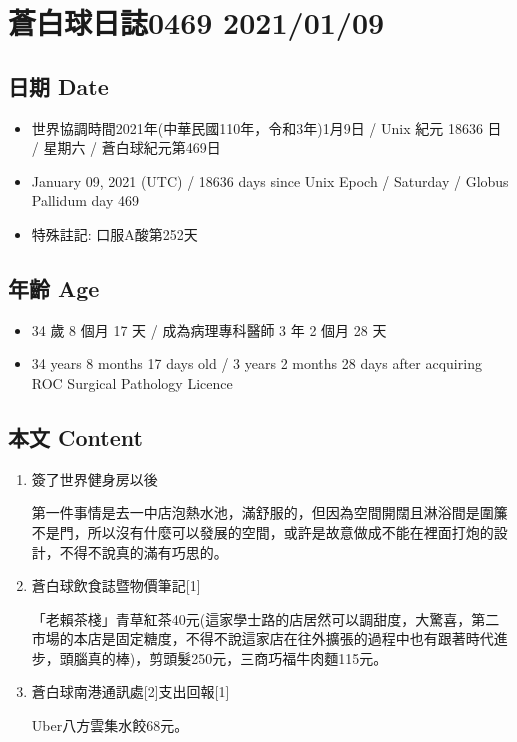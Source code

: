 \documentclass[a5paper, 11pt
]{book}
\providecommand{\tightlist}{%
  \setlength{\itemsep}{0pt}\setlength{\parskip}{0pt}}
\begin{document}
\hypertarget{ux84bcux767dux7403ux65e5ux8a8c0469-20210109}{%
\section{蒼白球日誌0469
2021/01/09}\label{ux84bcux767dux7403ux65e5ux8a8c0469-20210109}}

\hypertarget{ux65e5ux671f-date-39}{%
\subsection{日期 Date}\label{ux65e5ux671f-date-39}}

\begin{itemize}
\tightlist
\item
  世界協調時間2021年(中華民國110年，令和3年)1月9日 / Unix 紀元 18636 日
  / 星期六 / 蒼白球紀元第469日
\item
  January 09, 2021 (UTC) / 18636 days since Unix Epoch / Saturday /
  Globus Pallidum day 469
\item
  特殊註記: 口服A酸第252天
\end{itemize}

\hypertarget{ux5e74ux9f61-age-39}{%
\subsection{年齡 Age}\label{ux5e74ux9f61-age-39}}

\begin{itemize}
\tightlist
\item
  34 歲 8 個月 17 天 / 成為病理專科醫師 3 年 2 個月 28 天
\item
  34 years 8 months 17 days old / 3 years 2 months 28 days after
  acquiring ROC Surgical Pathology Licence
\end{itemize}

\hypertarget{ux672cux6587-content-39}{%
\subsection{本文 Content}\label{ux672cux6587-content-39}}

\begin{enumerate}
\def\labelenumi{\arabic{enumi}.}
\item
  簽了世界健身房以後

  第一件事情是去一中店泡熱水池，滿舒服的，但因為空間開闊且淋浴間是圍簾不是門，所以沒有什麼可以發展的空間，或許是故意做成不能在裡面打炮的設計，不得不說真的滿有巧思的。
\item
  蒼白球飲食誌暨物價筆記{[}1{]}

  「老賴茶棧」青草紅茶40元(這家學士路的店居然可以調甜度，大驚喜，第二市場的本店是固定糖度，不得不說這家店在往外擴張的過程中也有跟著時代進步，頭腦真的棒)，剪頭髮250元，三商巧福牛肉麵115元。
\item
  蒼白球南港通訊處{[}2{]}支出回報{[}1{]}

  Uber八方雲集水餃68元。
\end{enumerate}
\end{document}
